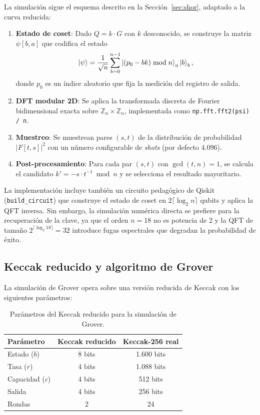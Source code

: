 La simulación sigue el esquema descrito en la Sección~\ref{sec:shor}, adaptado a la curva reducida:

\begin{enumerate}
  \item \textbf{Estado de coset}: Dado $Q = k \cdot G$ con $k$ desconocido, se construye la matriz $\psi[b, a]$ que codifica el estado
  \begin{equation}
    \ket{\psi} = \frac{1}{\sqrt{n}} \sum_{b=0}^{n-1} \ket{(p_0 - bk) \bmod n}_a \ket{b}_b,
  \end{equation}
  donde $p_0$ es un índice aleatorio que fija la medición del registro de salida.
  
  \item \textbf{DFT modular 2D}: Se aplica la transformada discreta de Fourier bidimensional exacta sobre $\mathbb{Z}_n \times \mathbb{Z}_n$, implementada como \texttt{np.fft.fft2(psi) / n}.
  
  \item \textbf{Muestreo}: Se muestrean pares $(s, t)$ de la distribución de probabilidad $|F[t, s]|^2$ con un número configurable de \emph{shots} (por defecto 4.096).
  
  \item \textbf{Post-procesamiento}: Para cada par $(s, t)$ con $\gcd(t, n) = 1$, se calcula el candidato $k' = -s \cdot t^{-1} \bmod n$ y se selecciona el resultado mayoritario.
\end{enumerate}

La implementación incluye también un circuito pedagógico de Qiskit (\texttt{build\_circuit}) que construye el estado de coset en $2 \lceil \log_2 n \rceil$ qubits y aplica la QFT inversa. Sin embargo, la simulación numérica directa se prefiere para la recuperación de la clave, ya que el orden $n = 18$ no es potencia de 2 y la QFT de tamaño $2^{\lceil \log_2 18 \rceil} = 32$ introduce fugas espectrales que degradan la probabilidad de éxito.

\subsection{Keccak reducido y algoritmo de Grover}

La simulación de Grover opera sobre una versión reducida de Keccak con los siguientes parámetros:

\begin{table}[htbp]
\centering
\caption{Parámetros del Keccak reducido para la simulación de Grover.}
\label{tab:toy_keccak}
\begin{tabular}{@{}lcc@{}}
\toprule
\textbf{Parámetro} & \textbf{Keccak reducido} & \textbf{Keccak-256 real} \\
\midrule
Estado ($b$) & 8 bits & 1.600 bits \\
Tasa ($r$) & 4 bits & 1.088 bits \\
Capacidad ($c$) & 4 bits & 512 bits \\
Salida & 4 bits & 256 bits \\
Rondas & 2 & 24 \\
\bottomrule
\end{tabular}
\end{table}

